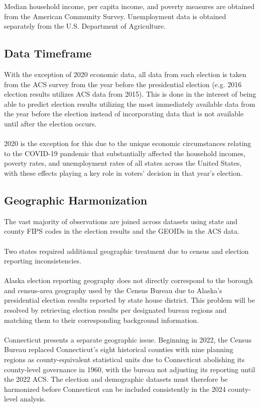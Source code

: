\documentclass[12pt]{article}
\begin{document}
	Median household income, per capita income, and poverty measures are
	obtained from the American Community Survey. Unemployment data is
	obtained separately from the U.S. Department of Agriculture.
	
	\subsection{Data Timeframe}
	
	With the exception of 2020 economic data, all data from each election is taken from the ACS survey from the year before the presidential election (e.g. 2016 election results utilizes ACS data from 2015). This is done in the interest of being able to predict election results utilizing the most immediately available data from the year before the election instead of incorporating data that is not available until after the election occurs. 
	\\\\
	2020 is the exception for this due to the unique economic circumstances relating to the COVID-19 pandemic that substantially affected the household incomes, poverty rates, and unemployment rates of all states across the United States, with these effects playing a key role in voters' decision in that year's election.
	
	\subsection{Geographic Harmonization}
	
	The vast majority of observations are joined across datasets using state and county FIPS codes in the election results and the GEOIDs in the ACS data.
	\\\\
	Two states required additional geographic treatment due to census and election reporting inconsistencies.
	\\\\
	Alaska election reporting geography does not directly correspond to
	the borough and census-area geography used by the Census Bureau due to Alaska's presidential election results reported by state house district. This problem will be resolved by retrieving election results per designated bureau regions and matching them to their corresponding background information.
	\\\\
	Connecticut presents a separate geographic issue. Beginning in 2022,
	the Census Bureau replaced Connecticut's eight historical counties
	with nine planning regions as county-equivalent statistical units due to Connecticut abolishing its county-level governance in 1960, with the bureau not adjusting its reporting until the 2022 ACS. The election and demographic datasets must therefore be harmonized
	before Connecticut can be included consistently in the 2024
	county-level analysis.
	
\end{document}
